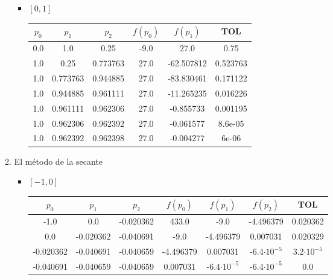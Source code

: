 \documentclass[12pt]{article}
\begin{document}
\begin{enumerate}
\begin{enumerate}
\begin{itemize}
            \item \([0, 1]\)
            
            \begin{center}
            \begin{tabular}{|c|c|c|c|c|c|}
            \hline
            \(p_0\) & \(p_1\)& \(p_2\)&\(f(p_0)\) & \(f(p_1)\) & \textbf{TOL} \\
            \hline
            0.0 & 1.0 & 0.25 & -9.0 & 27.0 &  0.75 \\
            1.0 & 0.25 & 0.773763 & 27.0 & -62.507812 &  0.523763 \\
            1.0 & 0.773763 & 0.944885 & 27.0 & -83.830461 &  0.171122 \\
            1.0 & 0.944885 & 0.961111 & 27.0 & -11.265235 &  0.016226 \\
            1.0 & 0.961111 & 0.962306 & 27.0 & -0.855733 &  0.001195 \\
            1.0 & 0.962306 & 0.962392 & 27.0 & -0.061577 &  8.6e-05 \\
            1.0 & 0.962392 & 0.962398 & 27.0 & -0.004277 &  6e-06 \\
            \hline 
            \end{tabular}
            \end{center}
        \end{itemize}
        \item El método de la secante
        \begin{itemize}
            \item \([-1, 0]\)
            \begin{center}
            \begin{tabular}{|c|c|c|c|c|c|c|}
            \hline
            \(p_0\) & \(p_1\)& \(p_2\)&\(f(p_0)\) & \(f(p_1)\) & \(f(p_2)\)&\textbf{TOL} \\
            \hline
            -1.0 & 0.0 & -0.020362 & 433.0 & -9.0 & -4.496379 & 0.020362 \\
            0.0 & -0.020362 & -0.040691 & -9.0 & -4.496379 & 0.007031 & 0.020329 \\
            -0.020362 & -0.040691 & -0.040659 & -4.496379 & 0.007031 & -6.4\(\cdot 10^{-5}\) & 3.2\(\cdot 10^{-5}\) \\
            -0.040691 & -0.040659 & -0.040659 & 0.007031 & -6.4\(\cdot 10^{-5}\) & -6.4\(\cdot 10^{-5}\) & 0.0 \\
            \hline 
            \end{tabular}
            \end{center}

\end{itemize}
\end{enumerate}
\end{enumerate}
\end{document}
